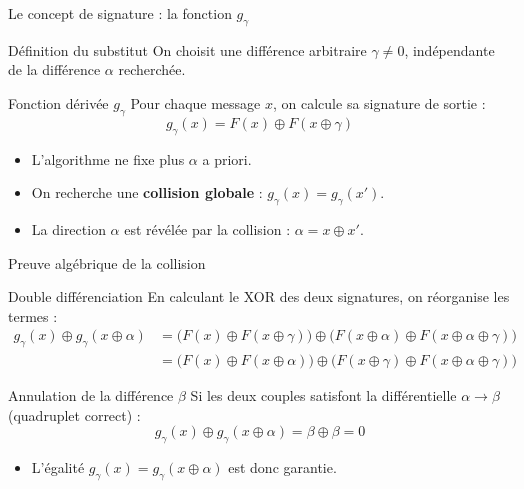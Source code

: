 \begin{frame}{Le concept de signature : la fonction $g_\gamma$}
    \begin{block}{Définition du substitut}
        On choisit une différence arbitraire $\gamma \neq 0$, indépendante de la différence $\alpha$ recherchée.
    \end{block}
    
    \begin{block}{Fonction dérivée $g_\gamma$}
        Pour chaque message $x$, on calcule sa signature de sortie :
        \[ g_{\gamma}(x) = F(x) \oplus F(x \oplus \gamma) \]
    \end{block}

    \begin{itemize}
        \item L'algorithme ne fixe plus $\alpha$ a priori.
        \item On recherche une \textbf{collision globale} : $g_\gamma(x) = g_\gamma(x')$.
        \item La direction $\alpha$ est révélée par la collision : $\alpha = x \oplus x'$.
    \end{itemize}
\end{frame}

\begin{frame}{Preuve algébrique de la collision}
    \begin{block}{Double différenciation}
        En calculant le XOR des deux signatures, on réorganise les termes :
        \begin{align*}
            g_\gamma(x) \oplus g_\gamma(x \oplus \alpha) &= \big( F(x) \oplus F(x \oplus \gamma) \big) \oplus \big( F(x \oplus \alpha) \oplus F(x \oplus \alpha \oplus \gamma) \big) \\
            &= \big( F(x) \oplus F(x \oplus \alpha) \big) \oplus \big( F(x \oplus \gamma) \oplus F(x \oplus \alpha \oplus \gamma) \big)
        \end{align*}
    \end{block}
    \begin{block}{Annulation de la différence $\beta$}
        Si les deux couples satisfont la différentielle $\alpha \to \beta$ (quadruplet correct) :
        \begin{equation*}
            g_\gamma(x) \oplus g_\gamma(x \oplus \alpha) = \beta \oplus \beta = 0
        \end{equation*}
    \end{block}
    \begin{itemize}
        \item L'égalité $g_\gamma(x) = g_\gamma(x \oplus \alpha)$ est donc garantie.
    \end{itemize}
\end{frame}

